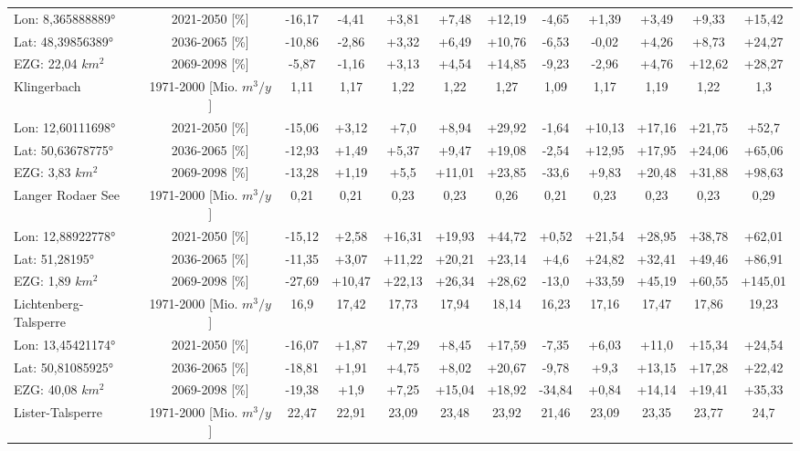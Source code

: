\begin{longtable}{@{\extracolsep{\fill}}lc|ccccc||ccccc}
\cline{2-12} 
Lon: 8,365888889° & 2021-2050 [\%]  & -16,17 & -4,41 & +3,81 & +7,48 & +12,19 & -4,65 & +1,39 & +3,49 & +9,33 & +15,42\\ 
Lat: 48,39856389° & 2036-2065 [\%]  & -10,86 & -2,86 & +3,32 & +6,49 & +10,76 & -6,53 & -0,02 & +4,26 & +8,73 & +24,27\\ 
EZG: 22,04 $km^2$ & 2069-2098 [\%]  & -5,87 & -1,16 & +3,13 & +4,54 & +14,85 & -9,23 & -2,96 & +4,76 & +12,62 & +28,27\\ 
\hline 
Klingerbach & 1971-2000 [Mio. $m^3/y$]  & 1,11 & 1,17 & 1,22 & 1,22 & 1,27 & 1,09 & 1,17 & 1,19 & 1,22 & 1,3\\ 
\cline{2-12} 
Lon: 12,60111698° & 2021-2050 [\%]  & -15,06 & +3,12 & +7,0 & +8,94 & +29,92 & -1,64 & +10,13 & +17,16 & +21,75 & +52,7\\ 
Lat: 50,63678775° & 2036-2065 [\%]  & -12,93 & +1,49 & +5,37 & +9,47 & +19,08 & -2,54 & +12,95 & +17,95 & +24,06 & +65,06\\ 
EZG: 3,83 $km^2$ & 2069-2098 [\%]  & -13,28 & +1,19 & +5,5 & +11,01 & +23,85 & -33,6 & +9,83 & +20,48 & +31,88 & +98,63\\ 
\hline 
Langer Rodaer See & 1971-2000 [Mio. $m^3/y$]  & 0,21 & 0,21 & 0,23 & 0,23 & 0,26 & 0,21 & 0,23 & 0,23 & 0,23 & 0,29\\ 
\cline{2-12} 
Lon: 12,88922778° & 2021-2050 [\%]  & -15,12 & +2,58 & +16,31 & +19,93 & +44,72 & +0,52 & +21,54 & +28,95 & +38,78 & +62,01\\ 
Lat: 51,28195° & 2036-2065 [\%]  & -11,35 & +3,07 & +11,22 & +20,21 & +23,14 & +4,6 & +24,82 & +32,41 & +49,46 & +86,91\\ 
EZG: 1,89 $km^2$ & 2069-2098 [\%]  & -27,69 & +10,47 & +22,13 & +26,34 & +28,62 & -13,0 & +33,59 & +45,19 & +60,55 & +145,01\\ 
\hline 
Lichtenberg-Talsperre & 1971-2000 [Mio. $m^3/y$]  & 16,9 & 17,42 & 17,73 & 17,94 & 18,14 & 16,23 & 17,16 & 17,47 & 17,86 & 19,23\\ 
\cline{2-12} 
Lon: 13,45421174° & 2021-2050 [\%]  & -16,07 & +1,87 & +7,29 & +8,45 & +17,59 & -7,35 & +6,03 & +11,0 & +15,34 & +24,54\\ 
Lat: 50,81085925° & 2036-2065 [\%]  & -18,81 & +1,91 & +4,75 & +8,02 & +20,67 & -9,78 & +9,3 & +13,15 & +17,28 & +22,42\\ 
EZG: 40,08 $km^2$ & 2069-2098 [\%]  & -19,38 & +1,9 & +7,25 & +15,04 & +18,92 & -34,84 & +0,84 & +14,14 & +19,41 & +35,33\\ 
\hline 
Lister-Talsperre & 1971-2000 [Mio. $m^3/y$]  & 22,47 & 22,91 & 23,09 & 23,48 & 23,92 & 21,46 & 23,09 & 23,35 & 23,77 & 24,7\\ 

\end{longtable}
